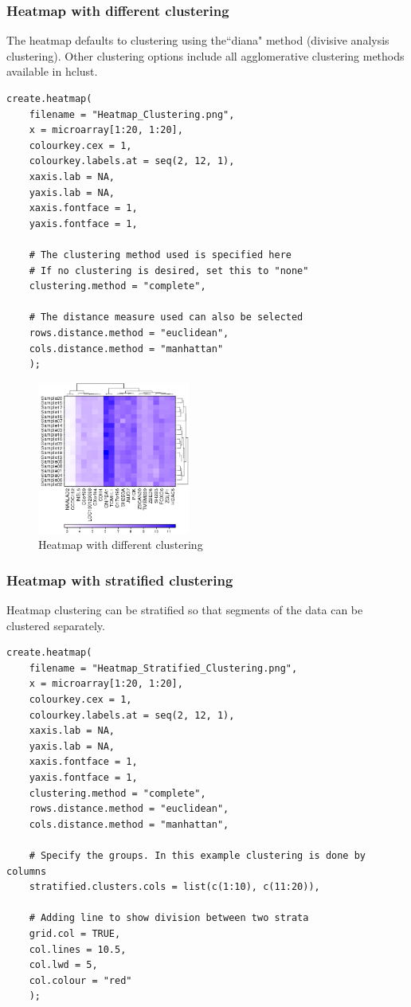 \documentclass[letterpaper]{article}
\begin{document}
\subsubsection{Heatmap with different clustering}
The heatmap defaults to clustering using the``diana" method (divisive analysis clustering). Other clustering options include all agglomerative clustering methods available in hclust.

\begin{verbatim}
create.heatmap(
    filename = "Heatmap_Clustering.png",
    x = microarray[1:20, 1:20],
    colourkey.cex = 1,
    colourkey.labels.at = seq(2, 12, 1),    
    xaxis.lab = NA,
    yaxis.lab = NA,
    xaxis.fontface = 1,
    yaxis.fontface = 1,
    
    # The clustering method used is specified here
    # If no clustering is desired, set this to "none"
    clustering.method = "complete",
    
    # The distance measure used can also be selected
    rows.distance.method = "euclidean",
    cols.distance.method = "manhattan"
    );
\end{verbatim}

\begin{figure}[!ht]
  \begin{center}
     \includegraphics[width=50mm]{Figures/Heatmap_Clustering.png}
     \caption{Heatmap with different clustering}
  \end{center}
\end{figure}

\subsubsection{Heatmap with stratified clustering}
Heatmap clustering can be stratified so that segments of the data can be clustered separately.

\begin{verbatim}
create.heatmap(
    filename = "Heatmap_Stratified_Clustering.png",
    x = microarray[1:20, 1:20],
    colourkey.cex = 1,
    colourkey.labels.at = seq(2, 12, 1),    
    xaxis.lab = NA,
    yaxis.lab = NA,
    xaxis.fontface = 1,
    yaxis.fontface = 1,
    clustering.method = "complete",
    rows.distance.method = "euclidean",
    cols.distance.method = "manhattan",
 
    # Specify the groups. In this example clustering is done by columns
    stratified.clusters.cols = list(c(1:10), c(11:20)),
    
    # Adding line to show division between two strata
    grid.col = TRUE,
    col.lines = 10.5,
    col.lwd = 5,
    col.colour = "red"
    );
\end{verbatim}
\end{document}
